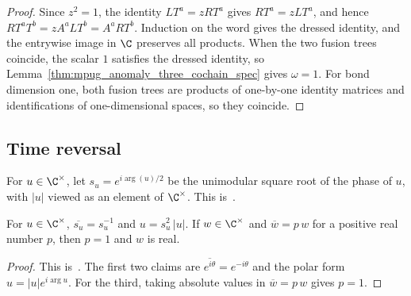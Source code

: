 \begin{proof}\leanok
    Since $z^2=1$, the identity $LT^a=zRT^a$ gives $RT^a=zLT^a$, and hence
    $RT^aT^b=zA^aLT^b=A^aRT^b$. Induction on the word gives the dressed
    identity, and the entrywise image in $\C$ preserves all products. When
    the two fusion trees coincide, the scalar $1$ satisfies the dressed
    identity, so Lemma~\ref{thm:mpug_anomaly_three_cochain_spec} gives
    $\omega=1$. For bond dimension one, both fusion trees are products of
    one-by-one identity matrices and identifications of one-dimensional
    spaces, so they coincide.
\end{proof}

\subsection{Time reversal}

\begin{definition}
    \label{def:mpug_phase_root}
    \leanok
    For $u\in\C^\times$, let $s_u=e^{i\arg(u)/2}$ be the unimodular square root
    of the phase of $u$, with $|u|$ viewed as an element of $\C^\times$.
    This is~\cite[``Unimodular square root and modulus of a
        phase'']{QICLean2026Blueprint}.
\end{definition}

\begin{lemma}
    \label{thm:mpug_phase_root}
    \leanok
    For $u\in\C^\times$, $\overline{s_u}=s_u^{-1}$ and $u=s_u^2\,|u|$. If
    $w\in\C^\times$ and $\overline w=p\,w$ for a positive real number $p$,
    then $p=1$ and $w$ is real.
\end{lemma}

\begin{proof}\leanok
    This is~\cite[``Unimodular square roots of phases'']{QICLean2026Blueprint}.
    The first two claims are $\overline{e^{i\theta}}=e^{-i\theta}$ and the
    polar form $u=|u|e^{i\arg u}$. For the third, taking absolute values in
    $\overline w=p\,w$ gives $p=1$.
\end{proof}

